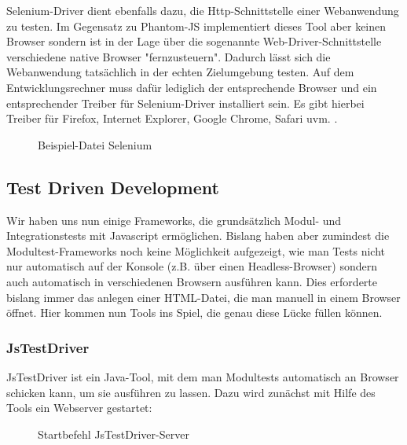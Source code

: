 Selenium-Driver dient ebenfalls dazu, die Http-Schnittstelle einer Webanwendung zu testen. Im Gegensatz zu Phantom-JS implementiert dieses Tool aber keinen Browser sondern ist in der Lage über die sogenannte Web-Driver-Schnittstelle verschiedene native Browser "fernzusteuern". Dadurch lässt sich die Webanwendung tatsächlich in der echten Zielumgebung testen. Auf dem Entwicklungsrechner muss dafür lediglich der entsprechende Browser und ein entsprechender Treiber für Selenium-Driver installiert sein. Es gibt hierbei Treiber für Firefox, Internet Explorer, Google Chrome, Safari uvm. \citep[Vgl.][]{Selenium13}.

\begin{figure}[H]
	\begin{center}
		\caption{Beispiel-Datei Selenium}
		\label{code:selenium}
	\end{center}
\end{figure}

\subsection{Test Driven Development}

Wir haben uns nun einige Frameworks, die grundsätzlich Modul- und Integrationstests mit Javascript ermöglichen. Bislang haben aber zumindest die Modultest-Frameworks noch keine Möglichkeit aufgezeigt, wie man Tests nicht nur automatisch auf der Konsole (z.B. über einen Headless-Browser) sondern auch automatisch in verschiedenen Browsern ausführen kann. Dies erforderte bislang immer das anlegen einer HTML-Datei, die man manuell in einem Browser öffnet. Hier kommen nun Tools ins Spiel, die genau diese Lücke füllen können.

\subsubsection{JsTestDriver}

JsTestDriver ist ein Java-Tool, mit dem man Modultests automatisch an Browser schicken kann, um sie ausführen zu lassen. Dazu wird zunächst mit Hilfe des Tools ein Webserver gestartet:

\begin{figure}[H]
	\begin{center}
		\caption{Startbefehl JsTestDriver-Server}
		\label{bash:jstestdriver}
	\end{center}
\end{figure}

